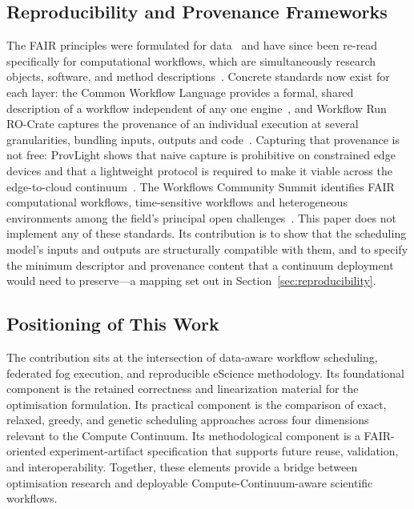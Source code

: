 \subsection{Reproducibility and Provenance Frameworks}
\label{subsec:rw_fair}

The FAIR principles were formulated for data~\cite{wilkinson2016fair} and have since been re-read
specifically for computational workflows, which are simultaneously research objects, software, and
method descriptions~\cite{swilkinson2025fairworkflows}. Concrete standards now exist for each
layer: the Common Workflow Language provides a formal, shared description of a workflow independent
of any one engine~\cite{crusoe2022cwl}, and Workflow Run RO-Crate captures the provenance of an
individual execution at several granularities, bundling inputs, outputs and
code~\cite{leo2024workflowruncrate}. Capturing that provenance is not free: ProvLight shows that
naive capture is prohibitive on constrained edge devices and that a lightweight protocol is
required to make it viable across the edge-to-cloud continuum~\cite{rosendo2023provlight}. The
Workflows Community Summit identifies FAIR computational workflows, time-sensitive workflows and
heterogeneous environments among the field's principal open challenges~\cite{workflowssummit2024}.
This paper does not implement any of these standards. Its contribution is to show that the
scheduling model's inputs and outputs are structurally compatible with them, and to specify the
minimum descriptor and provenance content that a continuum deployment would need to preserve---a
mapping set out in Section~\ref{sec:reproducibility}.


\subsection{Positioning of This Work}

The contribution sits at the intersection of data-aware workflow scheduling, federated fog execution, and reproducible eScience methodology. Its foundational component is the retained correctness and linearization material for the optimisation formulation. Its practical component is the comparison of exact, relaxed, greedy, and genetic scheduling approaches across four dimensions relevant to the Compute Continuum. Its methodological component is a FAIR-oriented experiment-artifact specification that supports future reuse, validation, and interoperability. Together, these elements provide a bridge between optimisation research and deployable Compute-Continuum-aware scientific workflows.
